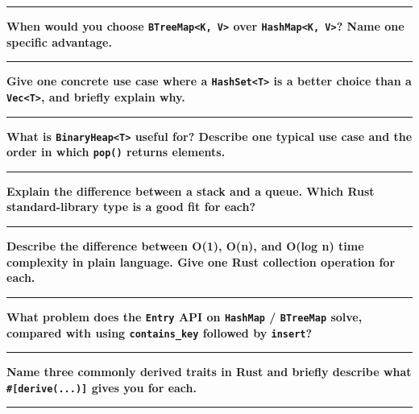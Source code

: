 \documentclass[
  11pt,
]{article}
\begin{document}
\begin{center}\rule{0.5\linewidth}{0.5pt}\end{center}

\textbf{When would you choose
\texttt{BTreeMap\textless{}K,\ V\textgreater{}} over
\texttt{HashMap\textless{}K,\ V\textgreater{}}? Name one specific
advantage.}

\begin{center}\rule{0.5\linewidth}{0.5pt}\end{center}

\textbf{Give one concrete use case where a
\texttt{HashSet\textless{}T\textgreater{}} is a better choice than a
\texttt{Vec\textless{}T\textgreater{}}, and briefly explain why.}

\begin{center}\rule{0.5\linewidth}{0.5pt}\end{center}

\textbf{What is \texttt{BinaryHeap\textless{}T\textgreater{}} useful
for? Describe one typical use case and the order in which \texttt{pop()}
returns elements.}

\begin{center}\rule{0.5\linewidth}{0.5pt}\end{center}

\textbf{Explain the difference between a stack and a queue. Which Rust
standard-library type is a good fit for each?}

\begin{center}\rule{0.5\linewidth}{0.5pt}\end{center}

\textbf{Describe the difference between O(1), O(n), and O(log n) time
complexity in plain language. Give one Rust collection operation for
each.}

\begin{center}\rule{0.5\linewidth}{0.5pt}\end{center}

\textbf{What problem does the \texttt{Entry} API on \texttt{HashMap} /
\texttt{BTreeMap} solve, compared with using \texttt{contains\_key}
followed by \texttt{insert}?}

\begin{center}\rule{0.5\linewidth}{0.5pt}\end{center}

\textbf{Name three commonly derived traits in Rust and briefly describe
what \texttt{\#{[}derive(...){]}} gives you for each.}

\begin{center}\rule{0.5\linewidth}{0.5pt}\end{center}
\end{document}
